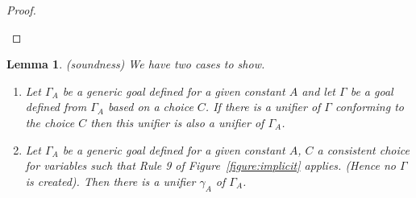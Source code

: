 \documentclass{article}
\newtheorem{lemma}{Lemma}
\newcommand{\barbara}[1]{\todo[inline, color=blue!40]{#1}}
\begin{document}
\begin{proof}
\begin{enumerate}
%		
%		
	\end{enumerate} 
\end{proof}

\begin{lemma}(soundness) \label{lemma:implsoundness}
	We have two cases to show.
	\begin{enumerate}
	\item Let $\Gamma_A$ be a generic goal defined for a given constant $A$ and let $\Gamma$ be a goal defined from $\Gamma_A$ based on a
	 choice $C$. If there is a unifier of $\Gamma$ conforming to the choice $C$ then this unifier is also a unifier of $\Gamma_A$.
	 \item Let  $\Gamma_A$ be a generic goal defined for a given constant $A$, $C$ a consistent choice for variables such that Rule 9 of Figure~\ref{figure:implicit} applies. (Hence no $\Gamma$ is created). Then there is a unifier $\gamma_A$ of $\Gamma_A$.
	 \end{enumerate}
\end{lemma}
\end{document}
